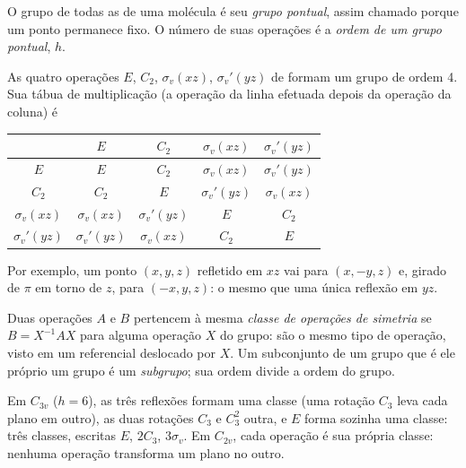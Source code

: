\begin{definition}\label{def:b3:point-groups:point-group}
O grupo de todas as  de uma molécula é seu \emph{grupo
pontual}, assim chamado porque um ponto permanece fixo. O
número de suas operações é a \emph{ordem de um grupo pontual},
$h$.
\end{definition}

\begin{example}\label{ex:b3:point-groups:c2v}
As quatro operações $E$, $C_2$, $\sigma_v(xz)$, $\sigma_v'(yz)$ de  formam um
grupo de ordem 4. Sua tábua de multiplicação (a operação da linha efetuada
depois da operação da coluna) é
\begin{center}\small
\begin{tabular}{c|cccc}
\hline
 & $E$ & $C_2$ & $\sigma_v(xz)$ & $\sigma_v'(yz)$\\ \hline
$E$ & $E$ & $C_2$ & $\sigma_v(xz)$ & $\sigma_v'(yz)$\\
$C_2$ & $C_2$ & $E$ & $\sigma_v'(yz)$ & $\sigma_v(xz)$\\
$\sigma_v(xz)$ & $\sigma_v(xz)$ & $\sigma_v'(yz)$ & $E$ & $C_2$\\
$\sigma_v'(yz)$ & $\sigma_v'(yz)$ & $\sigma_v(xz)$ & $C_2$ & $E$\\ \hline
\end{tabular}
\end{center}
Por exemplo, um ponto $(x, y, z)$ refletido em $xz$ vai para $(x, -y, z)$ e,
girado de $\pi$ em torno de $z$, para $(-x, y, z)$: o mesmo que uma única
reflexão em $yz$.
\end{example}

\begin{definition}\label{def:b3:point-groups:class}
Duas operações $A$ e $B$ pertencem à mesma \emph{classe de operações de
simetria} se $B = X^{-1}AX$ para alguma
operação $X$ do grupo: são o mesmo tipo de operação, visto em um referencial
deslocado por $X$. Um subconjunto de um grupo que é ele próprio um grupo é um
\emph{subgrupo}; sua ordem divide a ordem do grupo.
\end{definition}

\begin{example}[Classes de \ce{NH3}]\label{ex:b3:point-groups:classes}
Em $C_{3v}$ ($h = 6$), as três reflexões formam uma classe (uma rotação $C_3$
leva cada plano em outro), as duas rotações $C_3$ e $C_3^2$ outra,
e $E$ forma sozinha uma classe: três classes, escritas $E$, $2C_3$, $3\sigma_v$. Em
$C_{2v}$, cada operação é sua própria classe: nenhuma operação transforma um
plano no outro.
\end{example}

